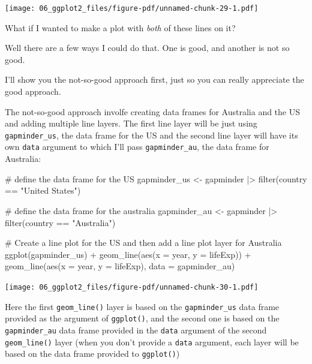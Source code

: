 \documentclass[
  letterpaper,
  DIV=11,
  numbers=noendperiod]{scrreprt}
\newenvironment{Shaded}{\begin{snugshade}}{\end{snugshade}}
\newcommand{\AttributeTok}[1]{\textcolor[rgb]{0.40,0.45,0.13}{#1}}
\newcommand{\CommentTok}[1]{\textcolor[rgb]{0.37,0.37,0.37}{#1}}
\newcommand{\FunctionTok}[1]{\textcolor[rgb]{0.28,0.35,0.67}{#1}}
\newcommand{\NormalTok}[1]{\textcolor[rgb]{0.00,0.23,0.31}{#1}}
\newcommand{\OtherTok}[1]{\textcolor[rgb]{0.00,0.23,0.31}{#1}}
\newcommand{\SpecialCharTok}[1]{\textcolor[rgb]{0.37,0.37,0.37}{#1}}
\newcommand{\StringTok}[1]{\textcolor[rgb]{0.13,0.47,0.30}{#1}}
\begin{document}
\texttt{[image: 06\_ggplot2\_files/figure-pdf/unnamed-chunk-29-1.pdf]}

What if I wanted to make a plot with \emph{both} of these lines on it?

Well there are a few ways I could do that. One is good, and another is
not so good.

I'll show you the not-so-good approach first, just so you can really
appreciate the good approach.

The not-so-good approach involfe creating data frames for Australia and
the US and adding multiple line layers. The first line layer will be
just using \texttt{gapminder\_us}, the data frame for the US and the
second line layer will have its own \texttt{data} argument to which I'll
pass \texttt{gapminder\_au}, the data frame for Australia:

\begin{Shaded}
\begin{Highlighting}[]
\CommentTok{\# define the data frame for the US}
\NormalTok{gapminder\_us }\OtherTok{\textless{}{-}}\NormalTok{ gapminder }\SpecialCharTok{|\textgreater{}}
  \FunctionTok{filter}\NormalTok{(country }\SpecialCharTok{==} \StringTok{"United States"}\NormalTok{)}

\CommentTok{\# define the data frame for the australia}
\NormalTok{gapminder\_au }\OtherTok{\textless{}{-}}\NormalTok{ gapminder }\SpecialCharTok{|\textgreater{}}
  \FunctionTok{filter}\NormalTok{(country }\SpecialCharTok{==} \StringTok{"Australia"}\NormalTok{)}

\CommentTok{\# Create a line plot for the US and then add a line plot layer for Australia}
\FunctionTok{ggplot}\NormalTok{(gapminder\_us) }\SpecialCharTok{+}
  \FunctionTok{geom\_line}\NormalTok{(}\FunctionTok{aes}\NormalTok{(}\AttributeTok{x =}\NormalTok{ year, }\AttributeTok{y =}\NormalTok{ lifeExp)) }\SpecialCharTok{+}
  \FunctionTok{geom\_line}\NormalTok{(}\FunctionTok{aes}\NormalTok{(}\AttributeTok{x =}\NormalTok{ year, }\AttributeTok{y =}\NormalTok{ lifeExp),}
            \AttributeTok{data =}\NormalTok{ gapminder\_au)}
\end{Highlighting}
\end{Shaded}

\texttt{[image: 06\_ggplot2\_files/figure-pdf/unnamed-chunk-30-1.pdf]}

Here the first \texttt{geom\_line()} layer is based on the
\texttt{gapminder\_us} data frame provided as the argument of
\texttt{ggplot()}, and the second one is based on the
\texttt{gapminder\_au} data frame provided in the \texttt{data} argument
of the second \texttt{geom\_line()} layer (when you don't provide a
\texttt{data} argument, each layer will be based on the data frame
provided to \texttt{ggplot()})
\end{document}
